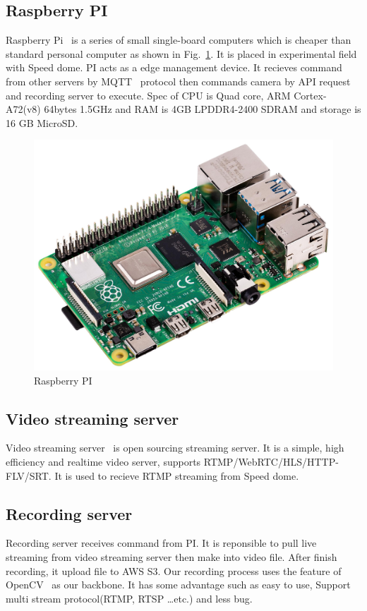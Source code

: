\subsection{Raspberry PI}
Raspberry Pi~\cite{pi} is a series of small single-board computers which is cheaper than standard personal computer as shown in Fig.~\ref{fig:pi}. It is placed in experimental field with Speed dome. PI acts as a edge management device. It recieves command from other servers by MQTT~\cite{mqtt-intro} protocol then commands camera by API request and recording server to execute. Spec of CPU is Quad core, ARM Cortex-A72(v8) 64bytes 1.5GHz and RAM is 4GB LPDDR4-2400 SDRAM and storage is 16 GB MicroSD.

\begin{figure}[H]
    \centering
    \includegraphics[width=\textwidth]{figsrc/pi.jpeg}
    \caption{Raspberry PI\label{fig:pi}}
\end{figure}

\subsection{Video streaming server}
Video streaming server~\cite{ossr} is open sourcing streaming server. It is a simple, high efficiency and realtime video server, supports RTMP/WebRTC/HLS/HTTP-FLV/SRT. It is used to recieve RTMP streaming from Speed dome.

\subsection{Recording server}
Recording server receives command from PI. It is reponsible to pull live streaming from video streaming server then make into video file. After finish recording, it upload file to AWS S3. Our recording process uses the feature of OpenCV~\cite{opencv} as our backbone. It has some advantage such as easy to use, Support multi stream protocol(RTMP, RTSP …etc.) and less bug.

